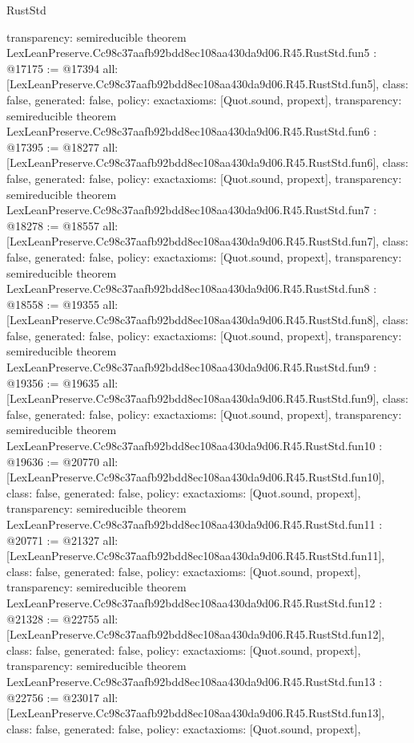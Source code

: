 \begin{lexlean}{RustStd}
\begin{coremodule}
{  transparency: semireducible
}
theorem LexLeanPreserve.Cc98c37aafb92bdd8ec108aa430da9d06.R45.RustStd.fun5 : @17175 := @17394 {
  all: [LexLeanPreserve.Cc98c37aafb92bdd8ec108aa430da9d06.R45.RustStd.fun5],
  class: false,
  generated: false,
  policy: exact{axioms: [Quot.sound, propext]},
  transparency: semireducible
}
theorem LexLeanPreserve.Cc98c37aafb92bdd8ec108aa430da9d06.R45.RustStd.fun6 : @17395 := @18277 {
  all: [LexLeanPreserve.Cc98c37aafb92bdd8ec108aa430da9d06.R45.RustStd.fun6],
  class: false,
  generated: false,
  policy: exact{axioms: [Quot.sound, propext]},
  transparency: semireducible
}
theorem LexLeanPreserve.Cc98c37aafb92bdd8ec108aa430da9d06.R45.RustStd.fun7 : @18278 := @18557 {
  all: [LexLeanPreserve.Cc98c37aafb92bdd8ec108aa430da9d06.R45.RustStd.fun7],
  class: false,
  generated: false,
  policy: exact{axioms: [Quot.sound, propext]},
  transparency: semireducible
}
theorem LexLeanPreserve.Cc98c37aafb92bdd8ec108aa430da9d06.R45.RustStd.fun8 : @18558 := @19355 {
  all: [LexLeanPreserve.Cc98c37aafb92bdd8ec108aa430da9d06.R45.RustStd.fun8],
  class: false,
  generated: false,
  policy: exact{axioms: [Quot.sound, propext]},
  transparency: semireducible
}
theorem LexLeanPreserve.Cc98c37aafb92bdd8ec108aa430da9d06.R45.RustStd.fun9 : @19356 := @19635 {
  all: [LexLeanPreserve.Cc98c37aafb92bdd8ec108aa430da9d06.R45.RustStd.fun9],
  class: false,
  generated: false,
  policy: exact{axioms: [Quot.sound, propext]},
  transparency: semireducible
}
theorem LexLeanPreserve.Cc98c37aafb92bdd8ec108aa430da9d06.R45.RustStd.fun10 : @19636 := @20770 {
  all: [LexLeanPreserve.Cc98c37aafb92bdd8ec108aa430da9d06.R45.RustStd.fun10],
  class: false,
  generated: false,
  policy: exact{axioms: [Quot.sound, propext]},
  transparency: semireducible
}
theorem LexLeanPreserve.Cc98c37aafb92bdd8ec108aa430da9d06.R45.RustStd.fun11 : @20771 := @21327 {
  all: [LexLeanPreserve.Cc98c37aafb92bdd8ec108aa430da9d06.R45.RustStd.fun11],
  class: false,
  generated: false,
  policy: exact{axioms: [Quot.sound, propext]},
  transparency: semireducible
}
theorem LexLeanPreserve.Cc98c37aafb92bdd8ec108aa430da9d06.R45.RustStd.fun12 : @21328 := @22755 {
  all: [LexLeanPreserve.Cc98c37aafb92bdd8ec108aa430da9d06.R45.RustStd.fun12],
  class: false,
  generated: false,
  policy: exact{axioms: [Quot.sound, propext]},
  transparency: semireducible
}
theorem LexLeanPreserve.Cc98c37aafb92bdd8ec108aa430da9d06.R45.RustStd.fun13 : @22756 := @23017 {
  all: [LexLeanPreserve.Cc98c37aafb92bdd8ec108aa430da9d06.R45.RustStd.fun13],
  class: false,
  generated: false,
  policy: exact{axioms: [Quot.sound, propext]},
}
\end{coremodule}
\end{lexlean}
